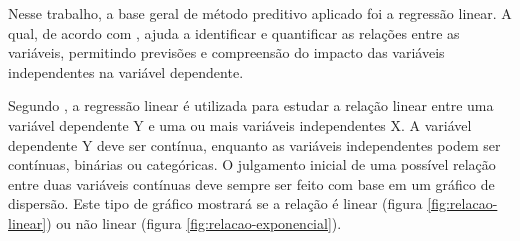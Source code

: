 Nesse trabalho, a base geral de método preditivo aplicado foi a regressão linear. A qual, de acordo com \cite{HESAMIAN2024}, ajuda a identificar e quantificar as relações entre as variáveis, permitindo previsões e compreensão do impacto das variáveis independentes na variável dependente. 

Segundo \cite{Schneider2010}, a regressão linear é utilizada para estudar a relação linear entre uma variável dependente Y e uma ou mais variáveis independentes X. A variável dependente Y deve ser contínua, enquanto as variáveis independentes podem ser contínuas, binárias ou categóricas. O julgamento inicial de uma possível relação entre duas variáveis contínuas deve sempre ser feito com base em um gráfico de dispersão. Este tipo de gráfico mostrará se a relação é linear (figura \ref{fig:relacao-linear}) ou não linear (figura \ref{fig:relacao-exponencial}).

\pagebreak

 	\begin{figure}[h!] 
   	    \captionsetup{width=6cm}%
	\end{figure}

  	\begin{figure}[h!] 
   	    \captionsetup{width=6cm}%
	\end{figure}

